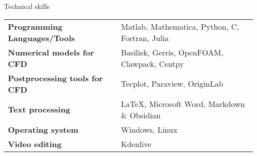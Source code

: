 \documentclass{resume} %
\makeatletter
\newcommand{\entry}[2]{#1 & #2 \tabularnewline} %
\newcommand{\tableEnv}[2]{%
  \begin{rSection}{#1} %
    \begin{adjustwidth}{0.0in}{0.1in} %
      \begin{tabularx}{\linewidth}{@{} >{\bfseries}l @{\hspace{6ex}} X @{}}
        #2 %
      \end{tabularx}
    \end{adjustwidth}
  \end{rSection}
}
\makeatother
\begin{document}

\tableEnv{Technical skills}{
	\entry{Programming Languages/Tools}{Matlab, Mathematica, Python, C, Fortran, Julia}
    \entry{Numerical models for CFD}{Basilisk, Gerris, OpenFOAM, Clawpack, Centpy}
    \entry{Postprocessing tools for CFD}{Tecplot, Paraview, OriginLab}
    \entry{Text processing}{\LaTeX, Microsoft Word, Markdown \& Obsidian}
    \entry{Operating system}{Windows, Linux}
    \entry{Video editing}{Kdenlive}
}


\end{document}
